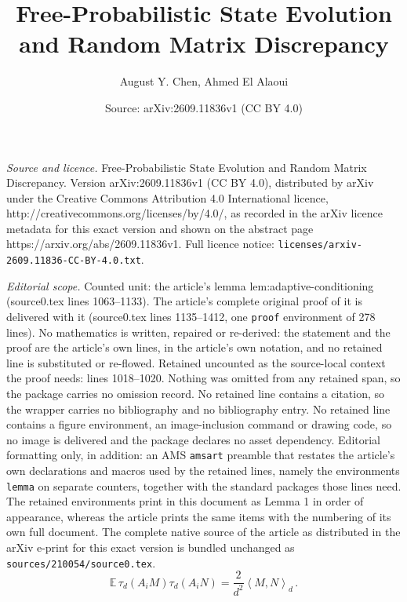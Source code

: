\documentclass[10pt,a4paper]{amsart}
\title{Free-Probabilistic State Evolution and Random Matrix Discrepancy}
\author{August Y. Chen, Ahmed El Alaoui}
\date{Source: arXiv:2609.11836v1 (CC BY 4.0)}
\newcommand{\E}{\mathbb E}
\newcommand{\ip}[2]{\left\langle #1,#2\right\rangle}
\newcommand{\taud}{\tau_d}
\begin{document}
\maketitle

\noindent\emph{Source and licence.} Free-Probabilistic State Evolution and Random Matrix Discrepancy. Version arXiv:2609.11836v1 (CC BY 4.0), distributed by arXiv under the Creative Commons Attribution 4.0 International licence, http://creativecommons.org/licenses/by/4.0/, as recorded in the arXiv licence metadata for this exact version and shown on the abstract page https://arxiv.org/abs/2609.11836v1. Full licence notice: \texttt{licenses/arxiv-2609.11836-CC-BY-4.0.txt}.\par\smallskip

\noindent\textit{Editorial scope.} Counted unit: the article's lemma lem:adaptive-conditioning (source0.tex lines 1063--1133). The article's complete original proof of it is delivered with it (source0.tex lines 1135--1412, one \texttt{proof} environment of 278 lines). No mathematics is written, repaired or re-derived: the statement and the proof are the article's own lines, in the article's own notation, and no retained line is substituted or re-flowed.  Retained uncounted as the source-local context the proof needs: lines 1018--1020.  Nothing was omitted from any retained span, so the package carries no omission record.  No retained line contains a citation, so the wrapper carries no bibliography and no bibliography entry.  No retained line contains a figure environment, an image-inclusion command or drawing code, so no image is delivered and the package declares no asset dependency.  Editorial formatting only, in addition: an AMS \texttt{amsart} preamble that restates the article's own declarations and macros used by the retained lines, namely the environments \texttt{lemma} on separate counters, together with the standard packages those lines need.  The retained environments print in this document as Lemma 1 in order of appearance, whereas the article prints the same items with the numbering of its own full document.  The complete native source of the article as distributed in the arXiv e-print for this exact version is bundled unchanged as \texttt{sources/210054/source0.tex}.
\begin{equation}\label{eq:cov-goe}
  \E\,\taud(A_i M)\taud(A_i N)=\frac{2}{d^2}\ip{M}{N}_d\,.
\end{equation}
\end{document}
